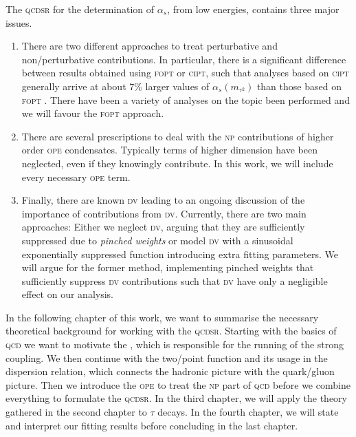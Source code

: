 \documentclass[../../index.tex]{subfiles}
\begin{document}
The \textsc{qcdsr} for the determination of \(\alpha_s\), from low energies,
contains three major issues.
\begin{enumerate}
\item There are two different approaches to treat perturbative and
  non\-/perturbative contributions. In particular, there is a significant
  difference between results obtained using \textsc{fopt} or \textsc{cipt}, such
  that analyses based on \textsc{cipt} generally arrive at about \(7\%\) larger
  values of \(\alpha_s(m_{\tau^2})\) than those based on \textsc{fopt}
  \cite{PDG2018}. There have been a variety of analyses on the topic been
  performed \cite{Pich2013,Caprini2009,Jamin2005} and we will favour the
  \textsc{fopt} approach.
\item There are several prescriptions to deal with the \textsc{np} contributions
  of higher order \textsc{ope} condensates. Typically terms of higher dimension
  have been neglected, even if they knowingly contribute. In this work, we will
  include every necessary \textsc{ope} term.

\item Finally, there are known \textsc{dv} leading to an ongoing discussion of
  the importance of contributions from \textsc{dv}. Currently, there are two main
  approaches: Either we neglect \textsc{dv}, arguing that they are sufficiently
  suppressed due to \textit{pinched weights} \cite{Pich2016} or model
  \textsc{dv} with a sinusoidal exponentially suppressed function
  \cite{Cata2008,Boito2011a,Boito2014} introducing extra fitting parameters. We
  will argue for the former method, implementing pinched weights that
  sufficiently suppress \textsc{dv} contributions such that \textsc{dv} have
  only a negligible effect on our analysis.
\end{enumerate}

In the following chapter of this work, we want to summarise the necessary
theoretical background for working with the \textsc{qcdsr}. Starting with the
basics of \textsc{qcd} we want to motivate the , which is responsible for the running of the strong coupling.
We then continue with the two\-/point function and its usage in the dispersion
relation, which connects the hadronic picture with the quark\-/gluon picture.
Then we introduce the \textsc{ope} to treat the \textsc{np} part of
\textsc{qcd} before we combine everything to formulate the \textsc{qcdsr}. In
the third chapter, we will apply the theory gathered in the second chapter to
\(\tau\) decays. In the fourth chapter, we will state and interpret our fitting
results before concluding in the last chapter.
\end{document}
